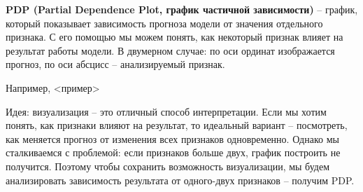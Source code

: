\textbf{PDP (Partial Dependence Plot, график частичной зависимости)} -- график, который показывает зависимость прогноза модели от значения отдельного признака. С его помощью мы можем понять, как некоторый признак влияет на результат работы модели. В двумерном случае: по оси ординат изображается прогноз, по оси абсцисс -- анализируемый признак.

Например, <пример>

Идея: визуализация -- это отличный способ интерпретации. Если мы хотим понять, как признаки влияют на результат, то идеальный вариант -- посмотреть, как меняется прогноз от изменения всех признаков одновременно. Однако мы сталкиваемся с проблемой: если признаков больше двух, график построить не получится. Поэтому чтобы сохранить возможность визуализации, мы будем анализировать зависимость результата от одного-двух признаков -- получим PDP.
